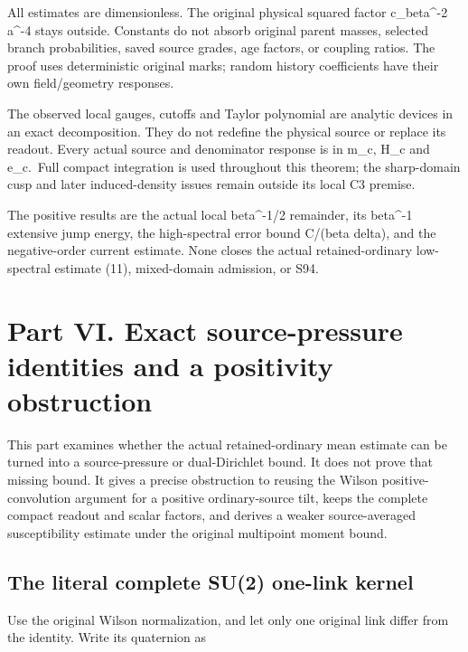 \documentclass[
  11pt,
]{article}
\begin{document}
All estimates are dimensionless. The original physical squared factor
c\_beta\^{}-2 a\^{}-4 stays outside. Constants do not absorb original
parent masses, selected branch probabilities, saved source grades, age
factors, or coupling ratios. The proof uses deterministic original
marks; random history coefficients have their own field/geometry
responses.

The observed local gauges, cutoffs and Taylor polynomial are analytic
devices in an exact decomposition. They do not redefine the physical
source or replace its readout. Every actual source and denominator
response is in m\_c, H\_c and e\_c.~Full compact integration is used
throughout this theorem; the sharp-domain cusp and later induced-density
issues remain outside its local C3 premise.

The positive results are the actual local beta\^{}-1/2 remainder, its
beta\^{}-1 extensive jump energy, the high-spectral error bound C/(beta
delta), and the negative-order current estimate. None closes the actual
retained-ordinary low-spectral estimate (11), mixed-domain admission, or
S94.

\newpage

\hypertarget{part-vi.-exact-source-pressure-identities-and-a-positivity-obstruction}{%
\section{Part VI. Exact source-pressure identities and a positivity
obstruction}\label{part-vi.-exact-source-pressure-identities-and-a-positivity-obstruction}}

This part examines whether the actual
retained-ordinary mean estimate can be turned into a source-pressure or dual-Dirichlet
bound. It does not prove that missing bound. It gives a precise
obstruction to reusing the Wilson positive-convolution argument for a
positive ordinary-source tilt, keeps the complete compact readout and
scalar factors, and derives a weaker source-averaged susceptibility
estimate under the original multipoint moment bound.

\hypertarget{the-literal-complete-su2-one-link-kernel}{%
\subsection{The literal complete SU(2) one-link
kernel}\label{the-literal-complete-su2-one-link-kernel}}

Use the original Wilson normalization, and let only one original link
differ from the identity. Write its quaternion as
\end{document}

